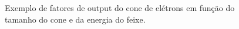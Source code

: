 \documentclass[11pt,a4paper]{article}
\begin{document}
	\begin{figure}[h]
		\centering
		\caption{Exemplo de fatores de output do cone de elétrons em função do tamanho do cone e da energia do feixe.}
		\label{fig:fatorcone}
	\end{figure}


\end{document}
